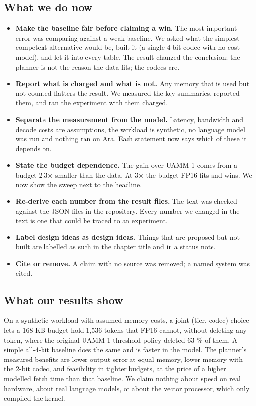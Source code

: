 \documentclass[12pt,a4paper]{report}
\begin{document}
\subsection{What we do now}
\begin{itemize}
\item \textbf{Make the baseline fair before claiming a win.} The most important error was comparing against a weak baseline. We asked what the simplest competent alternative would be, built it (a single 4-bit codec with no cost model), and let it into every table. The result changed the conclusion: the planner is not the reason the data fits; the codecs are.
\item \textbf{Report what is charged and what is not.} Any memory that is used but not counted flatters the result. We measured the key summaries, reported them, and ran the experiment with them charged.
\item \textbf{Separate the measurement from the model.} Latency, bandwidth and decode costs are assumptions, the workload is synthetic, no language model was run and nothing ran on Ara. Each statement now says which of these it depends on.
\item \textbf{State the budget dependence.} The gain over UAMM-1 comes from a budget 2.3× smaller than the data. At 3× the budget FP16 fits and wins. We now show the sweep next to the headline.
\item \textbf{Re-derive each number from the result files.} The text was checked against the JSON files in the repository. Every number we changed in the text is one that could be traced to an experiment.
\item \textbf{Label design ideas as design ideas.} Things that are proposed but not built are labelled as such in the chapter title and in a status note.
\item \textbf{Cite or remove.} A claim with no source was removed; a named system was cited.
\end{itemize}
\subsection{What our results show}
On a synthetic workload with assumed memory costs, a joint (tier, codec) choice lets a 168 KB budget hold 1,536 tokens that FP16 cannot, without deleting any token, where the original UAMM-1 threshold policy deleted 63 \% of them. A simple all-4-bit baseline does the same and is faster in the model. The planner's measured benefits are lower output error at equal memory, lower memory with the 2-bit codec, and feasibility in tighter budgets, at the price of a higher modelled fetch time than that baseline. We claim nothing about speed on real hardware, about real language models, or about the vector processor, which only compiled the kernel.
\end{document}
